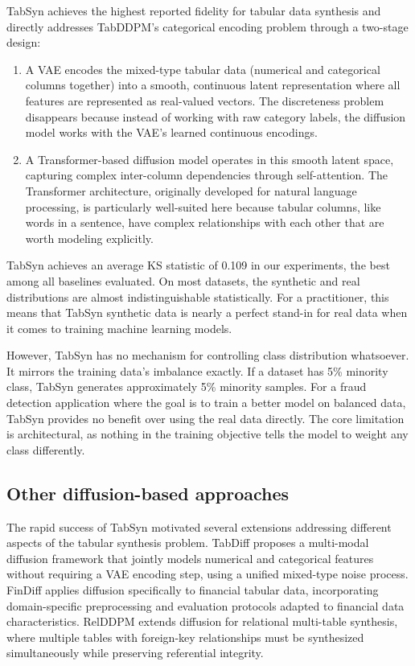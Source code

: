 TabSyn \cite{zhang2024tabsyn} achieves the highest reported fidelity for tabular data synthesis and directly addresses TabDDPM's categorical encoding problem through a two-stage design:
\begin{enumerate}
    \item A VAE encodes the mixed-type tabular data (numerical and categorical columns together) into a smooth, continuous latent representation where all features are represented as real-valued vectors. The discreteness problem disappears because instead of working with raw category labels, the diffusion model works with the VAE's learned continuous encodings.
    \item A Transformer-based diffusion model operates in this smooth latent space, capturing complex inter-column dependencies through self-attention. The Transformer architecture, originally developed for natural language processing, is particularly well-suited here because tabular columns, like words in a sentence, have complex relationships with each other that are worth modeling explicitly.
\end{enumerate}

TabSyn achieves an average KS statistic of 0.109 in our experiments, the best among all baselines evaluated. On most datasets, the synthetic and real distributions are almost indistinguishable statistically. For a practitioner, this means that TabSyn synthetic data is nearly a perfect stand-in for real data when it comes to training machine learning models.

However, TabSyn has no mechanism for controlling class distribution whatsoever. It mirrors the training data's imbalance exactly. If a dataset has 5\% minority class, TabSyn generates approximately 5\% minority samples. For a fraud detection application where the goal is to train a better model on balanced data, TabSyn provides no benefit over using the real data directly. The core limitation is architectural, as nothing in the training objective tells the model to weight any class differently.

\subsection{Other diffusion-based approaches}

The rapid success of TabSyn motivated several extensions addressing different aspects of the tabular synthesis problem. TabDiff \cite{shi2024tabdiff} proposes a multi-modal diffusion framework that jointly models numerical and categorical features without requiring a VAE encoding step, using a unified mixed-type noise process. FinDiff \cite{sattarov2023findiff} applies diffusion specifically to financial tabular data, incorporating domain-specific preprocessing and evaluation protocols adapted to financial data characteristics. RelDDPM \cite{liu2024relddpm} extends diffusion for relational multi-table synthesis, where multiple tables with foreign-key relationships must be synthesized simultaneously while preserving referential integrity.

